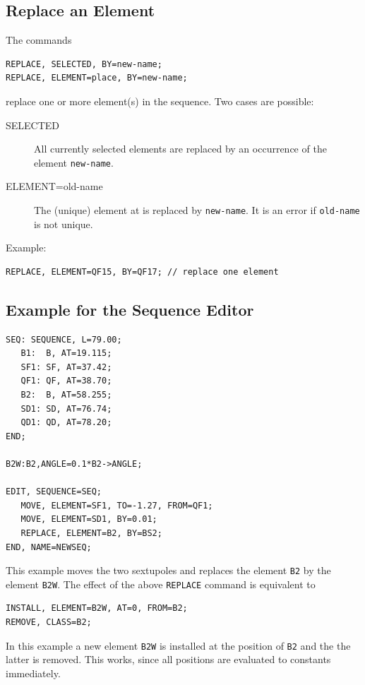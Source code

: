 \subsection{Replace an Element}
\label{sec:editreplace}
The commands
\begin{verbatim}
REPLACE, SELECTED, BY=new-name;
REPLACE, ELEMENT=place, BY=new-name;
\end{verbatim}
replace one or more element(s) in the sequence.
Two cases are possible:
\begin{description}
\item[SELECTED]
  All currently selected elements are replaced by an occurrence of the
  element \texttt{new-name}.
\item[ELEMENT=old-name]
  The (unique) element at  is replaced
  by \texttt{new-name}. 
  It is an error if \texttt{old-name} is not unique.
\end{description}
Example:
\begin{verbatim}
REPLACE, ELEMENT=QF15, BY=QF17; // replace one element
\end{verbatim}

\subsection{Example for the Sequence Editor}
\label{sec:editxmpl}
\begin{verbatim} 
SEQ: SEQUENCE, L=79.00;
   B1:  B, AT=19.115;
   SF1: SF, AT=37.42;
   QF1: QF, AT=38.70;
   B2:  B, AT=58.255;
   SD1: SD, AT=76.74;
   QD1: QD, AT=78.20;
END;

B2W:B2,ANGLE=0.1*B2->ANGLE;

EDIT, SEQUENCE=SEQ;
   MOVE, ELEMENT=SF1, TO=-1.27, FROM=QF1;
   MOVE, ELEMENT=SD1, BY=0.01;
   REPLACE, ELEMENT=B2, BY=BS2;
END, NAME=NEWSEQ;
\end{verbatim}
This example moves the two sextupoles and replaces the element \texttt{B2}
by the element \texttt{B2W}.
The effect of the above \texttt{REPLACE} command is equivalent to
\begin{verbatim}
INSTALL, ELEMENT=B2W, AT=0, FROM=B2;
REMOVE, CLASS=B2;
\end{verbatim}
In this example a new element \texttt{B2W} is installed at the position 
of \texttt{B2} and the the latter is removed.
This works, since all positions are evaluated to constants immediately.

